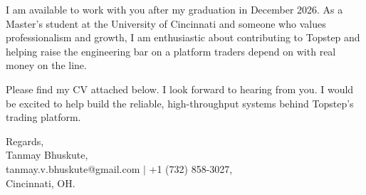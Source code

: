 \documentclass[11pt]{letter}
\begin{document}
\begin{letter}{}
I am available to work with you after my graduation in December 2026. As a Master's student at the University of Cincinnati and someone who values professionalism and growth, I am enthusiastic about contributing to Topstep and helping raise the engineering bar on a platform traders depend on with real money on the line.

Please find my CV attached below. I look forward to hearing from you. I would be excited to help build the reliable, high-throughput systems behind Topstep's trading platform.

{\setlength{\parskip}{0pt}
Regards,\\
Tanmay Bhuskute,\\
tanmay.v.bhuskute@gmail.com $\mid$ +1 (732) 858-3027,\\
Cincinnati, OH.
}

\end{letter}
\end{document}
